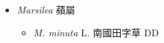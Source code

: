 
  \begin{itemize}
 \item[] \textit{Marsilea} 蘋屬
                                
  \begin{itemize}
        \item[] \textit{M. minuta} L.  南國田字草   DD
  \end{itemize}
  \end{itemize}
